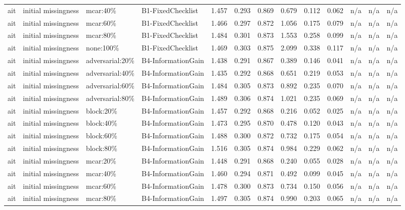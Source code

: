\begin{table}[!ht]
{\begin{tabular}{lllllllllllll}
ait & initial missingness & mcar:40\% & B1-FixedChecklist & 1.457 & 0.293 & 0.869 & 0.679 & 0.112 & 0.062 & n/a & n/a & n/a \\
ait & initial missingness & mcar:60\% & B1-FixedChecklist & 1.466 & 0.297 & 0.872 & 1.056 & 0.175 & 0.079 & n/a & n/a & n/a \\
ait & initial missingness & mcar:80\% & B1-FixedChecklist & 1.484 & 0.301 & 0.873 & 1.553 & 0.258 & 0.099 & n/a & n/a & n/a \\
ait & initial missingness & none:100\% & B1-FixedChecklist & 1.469 & 0.303 & 0.875 & 2.099 & 0.338 & 0.117 & n/a & n/a & n/a \\
ait & initial missingness & adversarial:20\% & B4-InformationGain & 1.438 & 0.291 & 0.867 & 0.389 & 0.146 & 0.041 & n/a & n/a & n/a \\
ait & initial missingness & adversarial:40\% & B4-InformationGain & 1.435 & 0.292 & 0.868 & 0.651 & 0.219 & 0.053 & n/a & n/a & n/a \\
ait & initial missingness & adversarial:60\% & B4-InformationGain & 1.484 & 0.305 & 0.873 & 0.892 & 0.235 & 0.070 & n/a & n/a & n/a \\
ait & initial missingness & adversarial:80\% & B4-InformationGain & 1.489 & 0.306 & 0.874 & 1.021 & 0.235 & 0.069 & n/a & n/a & n/a \\
ait & initial missingness & block:20\% & B4-InformationGain & 1.457 & 0.292 & 0.868 & 0.216 & 0.052 & 0.025 & n/a & n/a & n/a \\
ait & initial missingness & block:40\% & B4-InformationGain & 1.473 & 0.295 & 0.870 & 0.478 & 0.120 & 0.043 & n/a & n/a & n/a \\
ait & initial missingness & block:60\% & B4-InformationGain & 1.488 & 0.300 & 0.872 & 0.732 & 0.175 & 0.054 & n/a & n/a & n/a \\
ait & initial missingness & block:80\% & B4-InformationGain & 1.516 & 0.305 & 0.874 & 0.984 & 0.229 & 0.062 & n/a & n/a & n/a \\
ait & initial missingness & mcar:20\% & B4-InformationGain & 1.448 & 0.291 & 0.868 & 0.240 & 0.055 & 0.028 & n/a & n/a & n/a \\
ait & initial missingness & mcar:40\% & B4-InformationGain & 1.460 & 0.294 & 0.871 & 0.492 & 0.099 & 0.045 & n/a & n/a & n/a \\
ait & initial missingness & mcar:60\% & B4-InformationGain & 1.478 & 0.300 & 0.873 & 0.734 & 0.150 & 0.056 & n/a & n/a & n/a \\
ait & initial missingness & mcar:80\% & B4-InformationGain & 1.497 & 0.305 & 0.874 & 0.990 & 0.203 & 0.065 & n/a & n/a & n/a \\

\end{tabular}}
\end{table}
